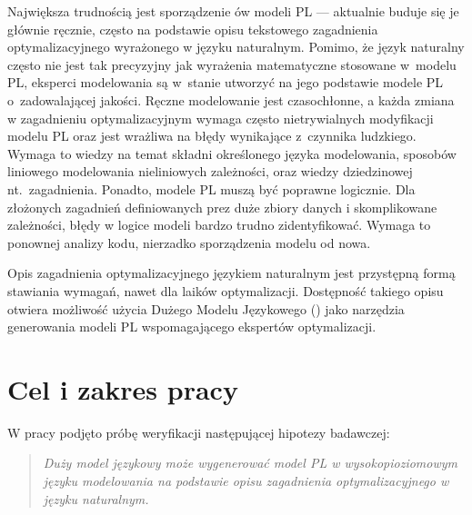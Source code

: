 Największa trudnością jest sporządzenie ów modeli PL --- aktualnie buduje się je głównie ręcznie, często na podstawie opisu tekstowego zagadnienia optymalizacyjnego wyrażonego w języku naturalnym.  Pomimo, że język naturalny często nie jest tak precyzyjny jak wyrażenia matematyczne stosowane w~modelu PL, eksperci modelowania są w~stanie utworzyć na jego podstawie modele PL o~zadowalającej jakości.
Ręczne modelowanie jest czasochłonne, a każda zmiana w zagadnieniu optymalizacyjnym wymaga często nietrywialnych modyfikacji modelu PL oraz jest wrażliwa na błędy wynikające z~czynnika ludzkiego. Wymaga to wiedzy na temat składni określonego języka modelowania, sposobów liniowego modelowania nieliniowych zależności, oraz wiedzy dziedzinowej nt.~zagadnienia.
Ponadto, modele PL muszą być poprawne logicznie. %
Dla złożonych zagadnień definiowanych prez duże zbiory danych i skomplikowane zależności, błędy w logice modeli bardzo trudno zidentyfikować. Wymaga to ponownej analizy kodu, nierzadko sporządzenia modelu od nowa.

Opis zagadnienia optymalizacyjnego językiem naturalnym jest przystępną formą stawiania wymagań, nawet dla laików optymalizacji. Dostępność takiego opisu otwiera możliwość użycia Dużego Modelu Językowego ()  jako narzędzia generowania modeli PL wspomagającego ekspertów optymalizacji.



\section{Cel i zakres pracy}

W pracy podjęto próbę weryfikacji następującej hipotezy badawczej:
\begin{quote}
\textit{Duży model językowy może wygenerować model PL w wysokopioziomowym języku modelowania na podstawie opisu zagadnienia optymalizacyjnego w języku naturalnym.}
\end{quote}



